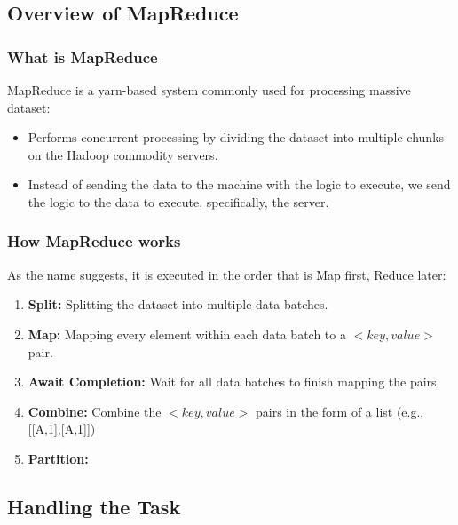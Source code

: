 \subsection{Overview of MapReduce}
\label{subsec:overview-of-mapreduce}

\subsubsection{What is MapReduce}

MapReduce is a yarn-based system commonly used for processing massive dataset:

\renewcommand{\labelitemi}{-}
\begin{itemize}
    \item Performs concurrent processing by dividing the dataset into multiple chunks on the Hadoop commodity servers.
    \item Instead of sending the data to the machine with the logic to execute, we send the logic to the data to execute, specifically, the server.
\end{itemize}

\subsubsection{How MapReduce works}

As the name suggests, it is executed in the order that is Map first, Reduce later:

\begin{enumerate}[label=\textbf{Step \arabic*.}]
    \item \textbf{Split:} Splitting the dataset into multiple data batches.
    \item \textbf{Map:} Mapping every element within each data batch to a $<key,value>$ pair.
    \item \textbf{Await Completion:} Wait for all data batches to finish mapping the pairs.
    \item \textbf{Combine:} Combine the $<key,value>$ pairs in the form of a list (e.g., [[A,1],[A,1]])
    \item \textbf{Partition:}
\end{enumerate}

\subsection{Handling the Task}
\label{subsec:handling-the-task}

